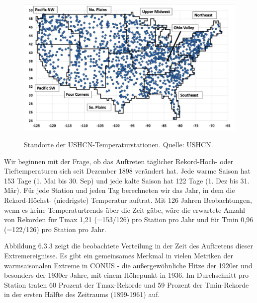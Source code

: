\documentclass[12pt,paper=a4,DIV=12,parskip=never,chapterprefix=false,headings=standardclasses]{scrreprt}
\begin{document}
\begin{figure}[H]
\begin{center}
\includegraphics[width=1.0\textwidth]{bilder/bilderKlima-0043.jpg}\\[1cm]
\end{center}
\caption{Standorte der USHCN-Temperaturstationen. Quelle: USHCN.}
\end{figure}

Wir beginnen mit der Frage, ob das Auftreten täglicher Rekord-Hoch- oder Tieftemperaturen sich seit Dezember 1898 verändert hat. Jede warme Saison hat 153 Tage (1. Mai bis 30. Sep) und jede kalte Saison hat 122 Tage (1. Dez bis 31. Mär). Für jede Station und jeden Tag berechneten wir das Jahr, in dem die Rekord-Höchst- (niedrigste) Temperatur auftrat. Mit 126 Jahren Beobachtungen, wenn es keine Temperaturtrends über die Zeit gäbe, wäre die erwartete Anzahl von Rekorden für Tmax 1,21 (=153/126) pro Station pro Jahr und für Tmin 0,96 (=122/126) pro Station pro Jahr.

Abbildung 6.3.3 zeigt die beobachtete Verteilung in der Zeit des Auftretens dieser Extremereignisse. Es gibt ein gemeinsames Merkmal in vielen Metriken der warmsaisonalen Extreme in CONUS - die außergewöhnliche Hitze der 1920er und besonders der 1930er Jahre, mit einem Höhepunkt in 1936. Im Durchschnitt pro Station traten 60 Prozent der Tmax-Rekorde und 59 Prozent der Tmin-Rekorde in der ersten Hälfte des Zeitraums (1899-1961) auf.
\end{document}
